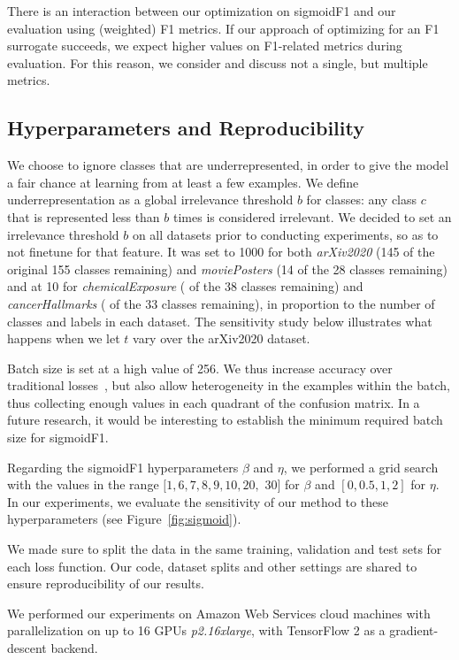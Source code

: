 There is an interaction between our optimization on sigmoidF1 and our evaluation using (weighted) F1 metrics. If our approach of optimizing for an F1 surrogate succeeds, we expect higher values on F1-related metrics during evaluation. For this reason, we consider and discuss not a single, but multiple metrics.

\subsection{Hyperparameters and Reproducibility}

We choose to ignore classes that are underrepresented, in order to give the model a fair chance at learning from at least a few examples. We define underrepresentation as a global irrelevance threshold $b$ for classes: any class $c$ that is represented less than $b$ times is considered irrelevant. We decided to set an irrelevance threshold $b$ on all datasets prior to conducting experiments, so as to not finetune for that feature. It was set to 1000 for both \emph{arXiv2020} (145 of the original 155 classes remaining) and \emph{moviePosters} (14 of the 28 classes remaining) and at 10 for \emph{chemicalExposure} ( of the 38 classes remaining) and \emph{cancerHallmarks} ( of the 33 classes remaining), in proportion to the number of classes and labels in each dataset. The sensitivity study below illustrates what happens when we let $t$ vary over the arXiv2020 dataset.

Batch size is set at a high value of 256. We thus increase accuracy over traditional losses~\cite{bigBS}, but also allow heterogeneity in the examples within the batch, thus collecting enough values in each quadrant of the confusion matrix. In a future research, it would be interesting to establish the minimum required batch size for sigmoidF1.  

Regarding the sigmoidF1 hyperparameters $\beta$ and $\eta$, we performed a grid search with the values in the range $[1, 6, 7, 8, 9, 10, 20,$ $30]$ for $\beta$ and $[0, 0.5, 1, 2]$ for $\eta$.
In our experiments, we evaluate the sensitivity of our method to these hyperparameters (see Figure~\ref{fig:sigmoid}).

We made sure to split the data in the same training, validation and test sets for each loss function. Our code, dataset splits and other settings are shared to ensure reproducibility of our results. 

We performed our experiments on Amazon Web Services cloud machines with parallelization on up to 16 GPUs \textit{p2.16xlarge}, with TensorFlow 2 as a gradient-descent backend.
